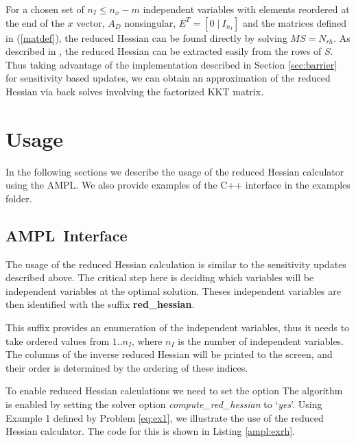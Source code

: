 \documentclass[letter, 11pt]{article}
\newcommand{\AMPL}{AMPL}
\newcommand{\redhessopt}{compute\_red\_hessian}
\newcommand{\redhess}{red\_hessian}
\begin{document}
For a chosen set of $n_I \leq n_x -
m$ independent variables with elements reordered at the end of the
$x$ vector, $A_D$ nonsingular, $E^T = [0 \;|\: I_{n_I}]$
and the matrices defined in (\ref{matdef}), the reduced Hessian can be
found directly by solving $M S = N_{rh}$. As described in \cite{pirnay:2011},
the reduced Hessian can be
extracted easily from the rows of $S$. Thus taking advantage of the
implementation described in Section \ref{sec:barrier} for sensitivity
based updates, we can obtain an approximation of the reduced Hessian
via back solves involving the factorized KKT matrix.

\section{Usage}

In the following sections we describe the usage of the reduced Hessian
calculator using the \AMPL. We also provide examples of
the C++ interface in the examples folder.


\subsection{\AMPL\ Interface}

The usage of the reduced Hessian calculation is similar to the sensitivity updates described above.
The critical step here is deciding which variables will be independent variables at the optimal solution.
Theses independent variables are then identified with the suffix \textbf{\redhess}.

This suffix provides an enumeration of the independent variables, thus it needs to take ordered values from
$1..n_I$, where $n_I$ is the number of independent variables. The columns of the inverse reduced Hessian will be printed to
the screen, and their order is determined by the ordering of these indices.

To enable reduced Hessian calculations we need to set the option
The algorithm is enabled by setting the solver option \emph{\redhessopt} to `\emph{yes}'.
Using Example 1 defined by Problem \eqref{eq:ex1}, we illustrate the use of the
reduced Hessian calculator. The code for this is shown in Listing \ref{ampl:exrh}.
\end{document}
